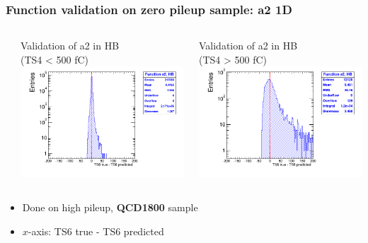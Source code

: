 \documentclass[bigger]{beamer}
\providecommand{\alert}[1]{\textbf{#1}}
\begin{document}
\begin{frame}
\frametitle{Function validation on zero pileup sample: a2 1D}
\label{sec-3-2-13}
\begin{columns} %
\label{sec-3-2-13-1}
\begin{column}{0.55\textwidth}
\label{sec-3-2-13-1-1}

\centering
Validation of a2 in HB \\ (TS4 < 500 fC)
\includegraphics[width=\textwidth]{fig/crosscheck_1D_sample1800_a2_under500_ring0.png}
\end{column}
\begin{column}{0.55\textwidth}
\label{sec-3-2-13-1-2}

\centering
Validation of a2 in HB \\ (TS4 > 500 fC)
\includegraphics[width=\textwidth]{fig/crosscheck_1D_sample1800_a2_over500_ring0.png}
\end{column}
\end{columns}
\label{sec-3-2-13-2}
\begin{itemize}

\item Done on high pileup, \alert{QCD1800} sample
\label{sec-3-2-13-2-1}%

\item $x$-axis: TS6 true - TS6 predicted
\label{sec-3-2-13-2-2}%
\end{itemize} %
\end{frame}
\end{document}
